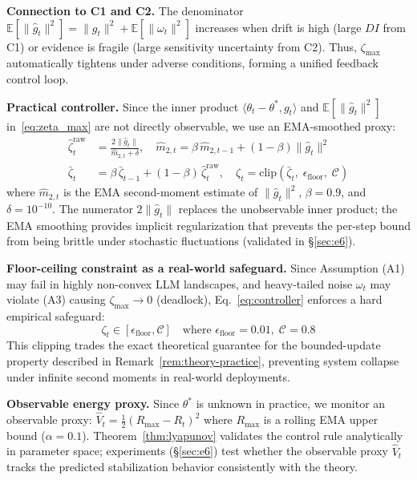 \documentclass{article}
\begin{document}
\textbf{Connection to C1 and C2.} The denominator
$\mathbb{E}[\|\hat{g}_t\|^2] = \|g_t\|^2 + \mathbb{E}[\|\omega_t\|^2]$
increases when drift is high (large $DI$ from C1) or evidence is
fragile (large sensitivity uncertainty from C2). Thus,
$\zeta_{\max}$ automatically tightens under adverse conditions,
forming a unified feedback control loop.

\textbf{Practical controller.} Since the inner product
$\langle \theta_t{-}\theta^*, g_t \rangle$ and $\mathbb{E}[\|\hat{g}_t\|^2]$
in~\eqref{eq:zeta_max} are not directly observable, we use an
EMA-smoothed proxy:
\begin{align}
  \hat{\zeta}^{\text{raw}}_t
    &= \frac{2\|\hat{g}_t\|}{\hat{m}_{2,t} + \delta},
    \quad
    \hat{m}_{2,t} = \beta\,\hat{m}_{2,t-1}
      + (1{-}\beta)\|\hat{g}_t\|^2
    \label{eq:zeta-raw} \\
  \bar{\zeta}_t &= \beta\,\bar{\zeta}_{t-1}
    + (1{-}\beta)\,\hat{\zeta}^{\text{raw}}_t,
    \quad
    \zeta_t = \mathrm{clip}(\bar{\zeta}_t,\;
      \epsilon_{\text{floor}},\; \mathcal{C})
    \label{eq:controller}
\end{align}
where $\hat{m}_{2,t}$ is the EMA second-moment estimate of
$\|\hat{g}_t\|^2$, $\beta{=}0.9$, and $\delta{=}10^{-10}$.
The numerator $2\|\hat{g}_t\|$ replaces the unobservable inner
product; the EMA smoothing provides implicit regularization that
prevents the per-step bound from being brittle under stochastic
fluctuations (validated in \S\ref{sec:e6}).

\textbf{Floor-ceiling constraint as a real-world safeguard.}
\label{par:heavytail}
Since Assumption (A1) may fail in highly non-convex LLM landscapes, and heavy-tailed noise $\omega_t$ may violate (A3) causing $\zeta_{\max} \to 0$ (deadlock), Eq.~\eqref{eq:controller} enforces a hard empirical safeguard:
\begin{equation}
  \zeta_t \in [\epsilon_{\text{floor}}, \mathcal{C}]
  \quad \text{where } \epsilon_{\text{floor}} = 0.01,\;
  \mathcal{C} = 0.8
  \label{eq:floor}
\end{equation}
This clipping trades the exact theoretical guarantee for the bounded-update property described in Remark~\ref{rem:theory-practice}, preventing system collapse under infinite second moments in real-world deployments.

\textbf{Observable energy proxy.} Since $\theta^*$ is unknown in
practice, we monitor an observable proxy:
$\hat{V}_t = \tfrac{1}{2}(R_{\max} - R_t)^2$
where $R_{\max}$ is a rolling EMA upper bound ($\alpha = 0.1$).
Theorem~\ref{thm:lyapunov} validates the control rule analytically
in parameter space; experiments (\S\ref{sec:e6}) test whether the
observable proxy $\hat{V}_t$ tracks the predicted stabilization
behavior consistently with the theory.
\end{document}
